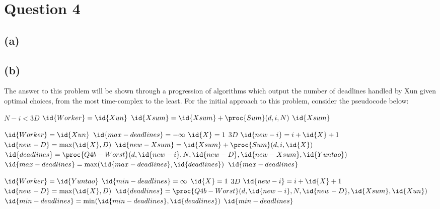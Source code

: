 \section{Question 4}
    \subsection{(a)}
    \subsection{(b)}
    The answer to this problem will be shown through a progression of algorithms which output the number of deadlines handled by Xun given optimal choices, from the most time-complex to the least.
    For the initial approach to this problem, consider the pseudocode below:
    \begin{spacing}{1.2}
        \begin{codebox}
            \li \If $N - i < 3D$
            \Then
                \li \If $\id{Worker} = \id{Xun}$
                \Then
                    \li $\id{Xsum} = \id{Xsum} + \proc{Sum}(d, i, N)$
                \End
                \li \Return $\id{Xsum}$
            \End

            \li \If $\id{Worker} = \id{Xun}$
            \Then
                \li $\id{max-deadlines} = -\infty$
                \li \For $\id{X} = 1$ \To $3D$
                \Do
                    \li $\id{new-i} = i + \id{X} + 1$
                    \li $\id{new-D} = \max(\id{X}, D)$
                    \li $\id{new-Xsum} = \id{Xsum} + \proc{Sum}(d, i, \id{X})$
                    \li $\id{deadlines} = \proc{Q4b-Worst}(d, \id{new-i}, N, \id{new-D}, \id{new-Xsum}, \id{Yuntao})$
                    \li $\id{max-deadlines} = \max(\id{max-deadlines}, \id{deadlines})$
                \End
                \li \Return $\id{max-deadlines}$
            \End

            \li \If $\id{Worker} = \id{Yuntao}$
            \Then
                \li $\id{min-deadlines} = \infty$
                \li \For $\id{X} = 1$ \To $3D$
                \Do
                    \li $\id{new-i} = i + \id{X} + 1$
                    \li $\id{new-D} = \max(\id{X}, D)$
                    \li $\id{deadlines} = \proc{Q4b-Worst}(d, \id{new-i}, N,\id{new-D}, \id{Xsum}, \id{Xun})$
                    \li $\id{min-deadlines} = \min(\id{min-deadlines}, \id{deadlines})$
                \End
                \li \Return $\id{min-deadlines}$
            \End
        \end{codebox}
    \end{spacing}
